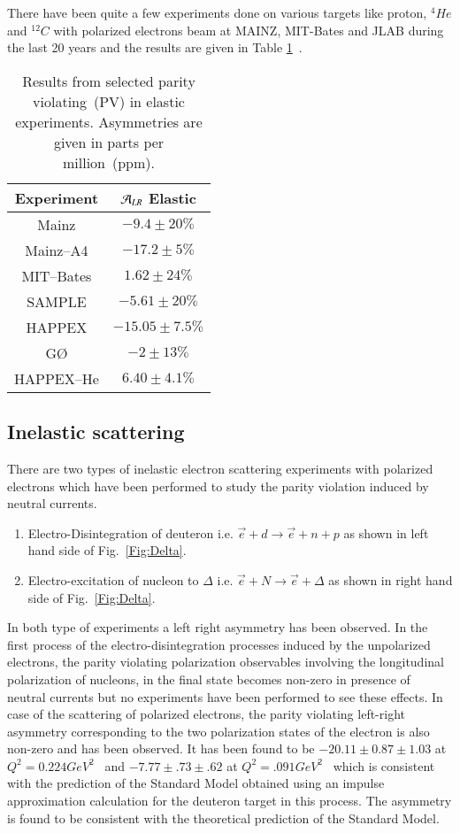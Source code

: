 There have been quite a few experiments done on various targets like proton, $^4{He}$ and $^{12}{C}$ with polarized electrons beam at MAINZ, MIT-Bates and JLAB during the last 20 years and the results are given in Table \ref{WS:asymm_tbl_elastic}~\cite{Erler:2014fqa}.
\begin{table}
\begin{center}
\begin{tabular}{|c|c|} \hline
 Experiment  & ${\cal A}_{LR}$ Elastic\\ \hline
 Mainz& $-9.4\pm20\%$ \\ \hline
 Mainz--A4&$-17.2\pm 5\%$ \\ \hline
 MIT--Bates& $1.62\pm 24\%$\\ \hline
 SAMPLE& $-5.61\pm 20\%$ \\ \hline
HAPPEX& $-15.05\pm 7.5\%$\\ \hline
G\O &$-2\pm13\%$ \\ \hline 
HAPPEX--He& $6.40\pm4.1\%$\\ \hline
\end{tabular}
\caption{Results from selected parity violating~(PV) in elastic experiments. Asymmetries are given in parts per million~(ppm).}
\label{WS:asymm_tbl_elastic}
\end{center}
\end{table}


\subsection{Inelastic scattering}
There are two types of inelastic electron scattering experiments with polarized electrons which have been performed to study the parity violation induced by neutral currents.
\begin{enumerate}
    \item Electro-Disintegration of deuteron i.e. $\vec{e}+d \rightarrow \vec{e}+n+p$ as shown in left hand side of Fig.~\ref{Fig:Delta}. 
    \item Electro-excitation of nucleon to $\Delta$ i.e. $\vec{e}+N \rightarrow \vec{e}+\Delta$ as shown in right hand side of Fig.~\ref{Fig:Delta}.  
\end{enumerate}
In both type of experiments a left right asymmetry has been observed. In the first process of the electro-disintegration  processes induced by the unpolarized electrons,  the parity violating polarization observables involving the longitudinal polarization of nucleons, in the final state becomes non-zero in presence of neutral currents but no experiments have been  performed to see these effects. In case of the scattering of polarized electrons, the parity violating left-right asymmetry corresponding to the two polarization states of the electron is also non-zero and has been observed. It has been found to be
$-20.11\pm0.87\pm1.03$ at $Q^2=0.224GeV^2$~\cite{BalaguerRios:2016ftd} and $-7.77\pm.73\pm.62$ at $Q^2=.091 GeV^2$~\cite{Ito:2003mr} which is consistent with the prediction of the Standard Model obtained using an impulse approximation calculation for the deuteron target in this process. The asymmetry is found to be consistent with the theoretical prediction of the Standard Model. \\

